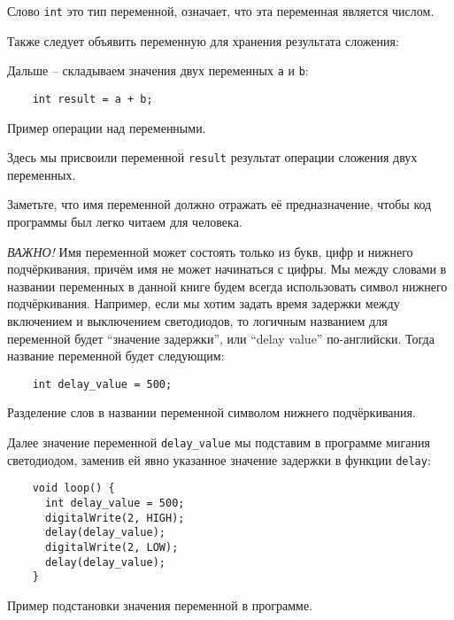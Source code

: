 \documentclass[../sparc.tex]{subfiles}
\begin{document}
Слово \texttt{int} это тип переменной, означает, что эта переменная является
числом.

Также следует объявить переменную для хранения результата сложения:

Дальше -- складываем значения двух переменных \texttt{a} и \texttt{b}:

\begin{listing}[ht]
  \begin{verbatim}
    int result = a + b;
  \end{verbatim}
  \label{listing:dialogues-with-computer-variable-operations-example}
  \caption{Пример операции над переменными.}
\end{listing}

Здесь мы присвоили переменной \texttt{result} результат операции сложения двух
переменных.

Заметьте, что имя переменной должно отражать её предназначение, чтобы код
программы был легко читаем для человека.

\emph{ВАЖНО!} Имя переменной может состоять только из букв, цифр и нижнего
подчёркивания, причём имя не может начинаться с цифры.  Мы между словами в
названии переменных в данной книге будем всегда использовать символ нижнего
подчёркивания.  Например, если мы хотим задать время задержки между включением и
выключением светодиодов, то логичным названием для переменной будет ``значение
задержки'', или ``delay value'' по-английски.  Тогда название переменной будет
следующим:

\begin{listing}[ht]
  \begin{verbatim}
    int delay_value = 500;
  \end{verbatim}
  \label{listing:dialogues-with-computer-variable-names}
  \caption{Разделение слов в названии переменной символом нижнего
    подчёркивания.}
\end{listing}

Далее значение переменной \texttt{delay\_value} мы подставим в программе мигания
светодиодом, заменив ей явно указанное значение задержки в функции
\texttt{delay}:

\begin{listing}[ht]
  \begin{verbatim}
    void loop() {
      int delay_value = 500;
      digitalWrite(2, HIGH);
      delay(delay_value);
      digitalWrite(2, LOW);
      delay(delay_value);
    }
  \end{verbatim}
  \label{listing:dialogues-with-computer-variable-usage}
  \caption{Пример подстановки значения переменной в программе.}
\end{listing}
\end{document}
